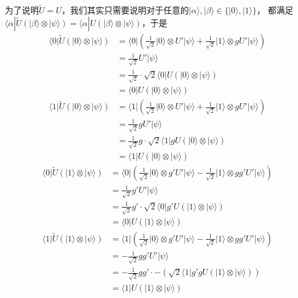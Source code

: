\documentclass[8pt]{article}
\def \ket#1{|#1 \rangle}
\def \bra#1{\langle #1|}
\begin{document}
\begin{appendices}
为了说明$\tilde{U} = U$，我们其实只需要说明对于任意的$\ket{\alpha}, \ket{\beta} \in \{\ket0, \ket1\}$， 都满足$\bra{\alpha}\tilde{U}(\ket{\beta}\otimes\ket{\psi}) = \bra{\alpha}U(\ket{\beta}\otimes\ket{\psi})$，于是
\begin{equation}
\begin{split}
\bra{0} \tilde{U} (\ket{0} \otimes \ket{\psi}) &= \bra{0}(\frac{1}{\sqrt 2}\ket{0} \otimes U'\ket{\psi} + \frac{1}{\sqrt 2}\ket{1}\otimes gU'\ket{\psi})\\
&= \frac{1}{\sqrt 2}U'\ket{\psi}\\
&= \frac{1}{\sqrt 2} \cdot \sqrt2\bra{0}U(\ket{0}\otimes\ket{\psi})\\
&= \bra{0} U (\ket{0} \otimes \ket{\psi})
\end{split}
\end{equation}
\begin{equation}
\begin{split}
\bra{1} \tilde{U} (\ket{0} \otimes \ket{\psi}) &= \bra{1}(\frac{1}{\sqrt 2}\ket{0} \otimes U'\ket{\psi} + \frac{1}{\sqrt 2}\ket{1}\otimes gU'\ket{\psi})\\
&= \frac{1}{\sqrt 2}gU'\ket{\psi}\\
&= \frac{1}{\sqrt 2}g \cdot \sqrt2\bra{1}gU(\ket{0}\otimes\ket{\psi})\\
&= \bra{1} U (\ket{0} \otimes \ket{\psi})
\end{split}
\end{equation}
\begin{equation}
\begin{split}
\bra{0} \tilde{U} (\ket{1} \otimes \ket{\psi}) &= 
\bra{0}(\frac{1}{\sqrt 2}\ket{0}\otimes g'U'\ket{\psi} - \frac{1}{\sqrt 2}\ket{1}\otimes gg'U'\ket{\psi})\\
&= \frac{1}{\sqrt 2}g'U'\ket{\psi}\\
&= \frac{1}{\sqrt 2}g' \cdot \sqrt2\bra{0}g'U(\ket{1}\otimes\ket{\psi})\\
&= \bra{0} U (\ket{1} \otimes \ket{\psi})
\end{split}
\end{equation}
\begin{equation}
\begin{split}
\bra{1} \tilde{U} (\ket{1} \otimes \ket{\psi}) &= 
\bra{1}(\frac{1}{\sqrt 2}\ket{0}\otimes g'U'\ket{\psi} - \frac{1}{\sqrt 2}\ket{1}\otimes gg'U'\ket{\psi})\\
&= -\frac{1}{\sqrt 2}gg'U'\ket{\psi}\\
&= -\frac{1}{\sqrt 2}gg' \cdot -(\sqrt2\bra{1}g'gU(\ket{1}\otimes\ket{\psi}))\\
&= \bra{1} U (\ket{1} \otimes \ket{\psi})\\
\end{split}
\end{equation}


\end{appendices}
\end{document}
